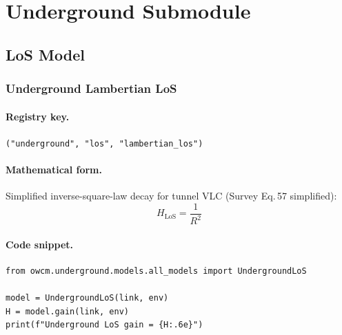 \documentclass[11pt,a4paper]{article}
\begin{document}
\newpage
\section{Underground Submodule}

\subsection{LoS Model}

\subsubsection{Underground Lambertian LoS}
\label{sec:underground_los}

\paragraph{Registry key.} \texttt{("underground", "los", "lambertian\_los")}

\paragraph{Mathematical form.}
Simplified inverse-square-law decay for tunnel VLC (Survey Eq.\,57 simplified):
\begin{equation}
\boxed{H_{\text{LoS}} = \frac{1}{R^2}}
\end{equation}

\paragraph{Code snippet.}
\begin{lstlisting}
from owcm.underground.models.all_models import UndergroundLoS

model = UndergroundLoS(link, env)
H = model.gain(link, env)
print(f"Underground LoS gain = {H:.6e}")
\end{lstlisting}

\end{document}
